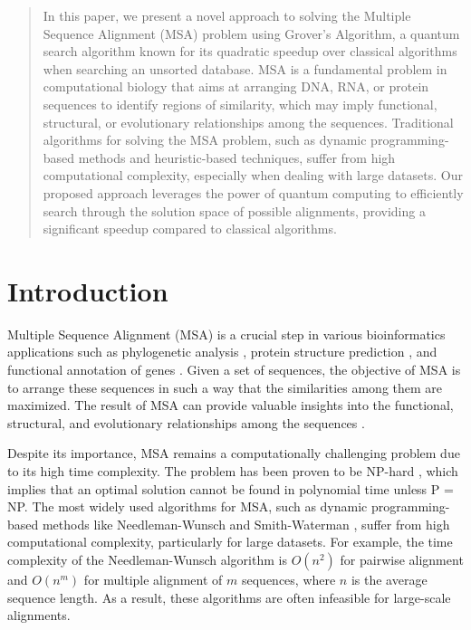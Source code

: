\begin{abstract}
In this paper, we present a novel approach to solving the Multiple Sequence Alignment (MSA) problem using Grover's Algorithm, a quantum search algorithm known for its quadratic speedup over classical algorithms when searching an unsorted database. MSA is a fundamental problem in computational biology that aims at arranging DNA, RNA, or protein sequences to identify regions of similarity, which may imply functional, structural, or evolutionary relationships among the sequences. Traditional algorithms for solving the MSA problem, such as dynamic programming-based methods and heuristic-based techniques, suffer from high computational complexity, especially when dealing with large datasets. Our proposed approach leverages the power of quantum computing to efficiently search through the solution space of possible alignments, providing a significant speedup compared to classical algorithms.

\end{abstract}

\section{Introduction}

Multiple Sequence Alignment (MSA) is a crucial step in various bioinformatics applications such as phylogenetic analysis \cite{phylogenetic}, protein structure prediction \cite{protein_structure}, and functional annotation of genes \cite{genes_annotation}. Given a set of sequences, the objective of MSA is to arrange these sequences in such a way that the similarities among them are maximized. The result of MSA can provide valuable insights into the functional, structural, and evolutionary relationships among the sequences \cite{msa_applications}.

Despite its importance, MSA remains a computationally challenging problem due to its high time complexity. The problem has been proven to be NP-hard \cite{msa_np_hard}, which implies that an optimal solution cannot be found in polynomial time unless P = NP. The most widely used algorithms for MSA, such as dynamic programming-based methods like Needleman-Wunsch \cite{needleman_wunsch} and Smith-Waterman \cite{smith_waterman}, suffer from high computational complexity, particularly for large datasets. For example, the time complexity of the Needleman-Wunsch algorithm is $O(n^2)$ for pairwise alignment and $O(n^m)$ for multiple alignment of $m$ sequences, where $n$ is the average sequence length. As a result, these algorithms are often infeasible for large-scale alignments.

